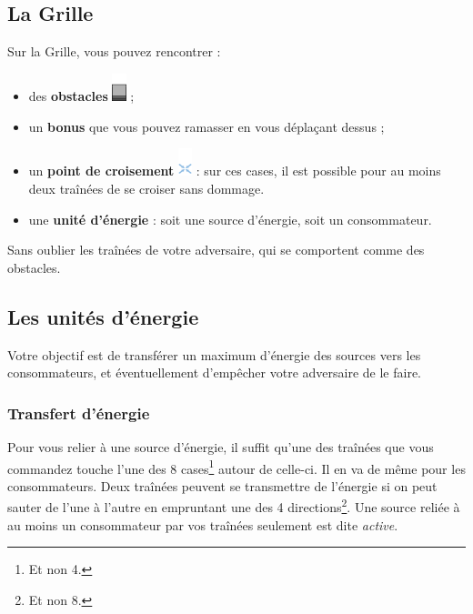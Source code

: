\subsection{La Grille}


Sur la Grille, vous pouvez rencontrer :

\begin{itemize}
  \item des \textbf{obstacles} \includegraphics[width=4mm]{../data/graphics/terrain-obstacle.png} ;
  \item un \textbf{bonus} que vous pouvez ramasser en vous déplaçant dessus ;
  \item un \textbf{point de croisement} \includegraphics[width=4mm]{../data/graphics/terrain-point_croisement.png} : sur ces cases, il est
    possible pour au moins deux traînées de se croiser sans dommage.
  \item une \textbf{unité d'énergie} : soit une
    source d'énergie, soit un consommateur.
\end{itemize}

Sans oublier les traînées de votre adversaire, qui se comportent comme des obstacles.

\subsection{Les unités d'énergie}

Votre objectif est de transférer un maximum
d'énergie des sources vers les consommateurs, et éventuellement d'empêcher votre
adversaire de le faire.

\subsubsection{Transfert d'énergie}

Pour vous relier à une source d'énergie, il suffit qu'une des traînées que vous commandez touche l'une des 8 cases\footnote{Et non 4.} autour de celle-ci. Il en va de même pour les consommateurs. Deux traînées peuvent se transmettre de l'énergie si on peut sauter de l'une à l'autre en empruntant une des 4 directions\footnote{Et non 8.}. Une source reliée à au moins un consommateur par vos traînées seulement est dite \emph{active}.

